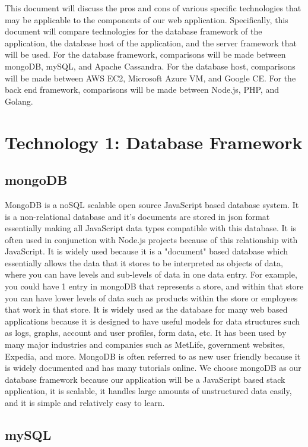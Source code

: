 \documentclass[onecolumn, draftclsnofoot,10pt, compsoc]{IEEEtran}
\begin{document}
	This document will discuss the pros and cons of various specific technologies that may be applicable to the components of our web application. Specifically, this
	document will compare technologies for the database framework of the application, the database host of the application, and the server framework that will be used.
	For the database framework, comparisons will be made between mongoDB, mySQL, and Apache Cassandra. For the database host, comparisons will be made between AWS EC2, Microsoft Azure VM, and Google CE.
	For the back end framework, comparisons will be made between Node.js, PHP, and Golang.


\section{Technology 1: Database Framework}
	
	\subsection{mongoDB}
	
		MongoDB is a noSQL scalable open source JavaScript based database system. It is a non-relational database and it's documents are stored in json format essentially making all JavaScript data types compatible with this
		database. It is often used in conjunction with Node.js projects because of this relationship with JavaScript. It is widely used because it is a "document" based
		database which essentially allows the data that it stores to be interpreted as objects of data, where you can have levels and sub-levels of data in one data entry.
		For example, you could have 1 entry in mongoDB that represents a store, and within that store you can have lower levels of data such as products within the store 
		or employees that work in that store. It is widely used as the database for many web based applications because it is designed to have useful models for data structures
		such as logs, graphs, account and user profiles, form data, etc. It has been used by many major industries and companies such as MetLife, government websites, Expedia, and more.
		MongoDB is often referred to as new user friendly because it is widely documented and has many tutorials online. We choose mongoDB as our database framework because our application
		will be a JavaScript based stack application, it is scalable, it handles large amounts of unstructured data easily, and it is simple and relatively easy to learn.
		
	\subsection{mySQL}	
	
\end{document}
